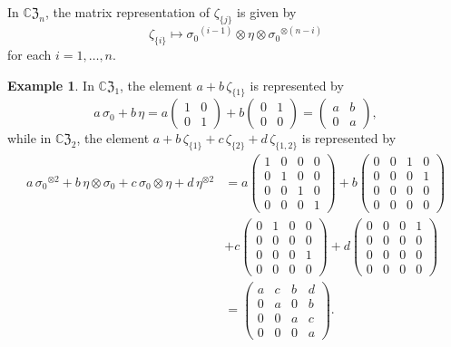 \documentclass{article}
\theoremstyle{definition}
\newtheorem{example}[theorem]{Example}
\newcommand{\CZ}{\mathbb{C}\mathfrak{Z}}
\numberwithin{equation}{section}
\begin{document}
In $\CZ_n$, the matrix representation of $\zeta_{\{j\}}$ is given by \begin{equation*}
\zeta_{\{i\}}\mapsto {\sigma_0}^{(i-1)}\otimes\eta\otimes{\sigma_0}^{\otimes(n-i)}
\end{equation*}
for each $i=1,\ldots, n$.

\begin{example}
In $\CZ_1$, the element $a+b\,\zeta_{\{1\}}$ is represented by \begin{equation*}
a\,\sigma_0+b\,\eta= a\begin{pmatrix}
1&0\\
0&1\end{pmatrix}+b\begin{pmatrix}0&1\\0&0\end{pmatrix}= \begin{pmatrix}
a&b\\
0&a\end{pmatrix},
\end{equation*}
while in $\CZ_2$, the element $a+b\,\zeta_{\{1\}}+c\,\zeta_{\{2\}}+d\,\zeta_{\{1,2\}}$ is represented by \begin{align*}
a \,{\sigma_0}^{\otimes 2}+b\,\eta\otimes{\sigma_0}+c\,\sigma_0\otimes\eta+d\,\eta^{\otimes 2}&=a\begin{pmatrix}
1&0&0&0\\
0&1&0&0\\
0&0&1&0\\
0&0&0&1\end{pmatrix}+b\begin{pmatrix}
0&0&1&0\\
0&0&0&1\\
0&0&0&0\\
0&0&0&0\end{pmatrix}\\
&+c\begin{pmatrix}
0&1&0&0\\
0&0&0&0\\
0&0&0&1\\
0&0&0&0\end{pmatrix}+d\begin{pmatrix}
0&0&0&1\\
0&0&0&0\\
0&0&0&0\\
0&0&0&0\end{pmatrix}\\
&=\begin{pmatrix}
a&c&b&d\\
0&a&0&b\\
0&0&a&c\\
0&0&0&a\end{pmatrix}.
\end{align*}
\end{example}
\end{document}
